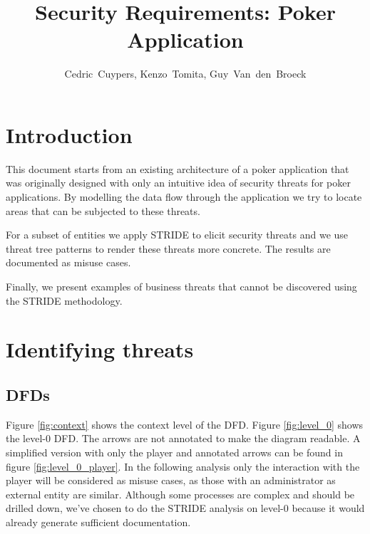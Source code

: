 \documentclass[a4paper,11pt]{report}
\author{Cedric~Cuypers, Kenzo~Tomita, Guy~Van~den~Broeck}
\title{Security Requirements: Poker Application}
\begin{document}
 
\maketitle 
\tableofcontents 

\chapter{Introduction}
This document starts from an existing architecture of a poker application that was originally designed with only an intuitive idea of security threats for poker applications. By modelling the data flow through the application we try to locate areas that can be subjected to these threats. 

For a subset of entities we apply STRIDE to elicit security threats and we use threat tree patterns to render these threats more concrete. The results are documented as misuse cases.

Finally, we present examples of business threats that cannot be discovered using the STRIDE methodology. 


\chapter{Identifying threats}
\section{DFDs}
Figure \ref{fig:context} shows the context level of the DFD. Figure \ref{fig:level_0} shows the level-0 DFD. The arrows are not annotated to make the diagram readable. A simplified version with only the player and annotated arrows can be found in figure \ref{fig:level_0_player}. In the following analysis only the interaction with the player will be considered as misuse cases, as those with an administrator as external entity are similar. Although some processes are complex and should be drilled down, we've chosen to do the STRIDE analysis on level-0 because it would already generate sufficient documentation.
\end{document}
